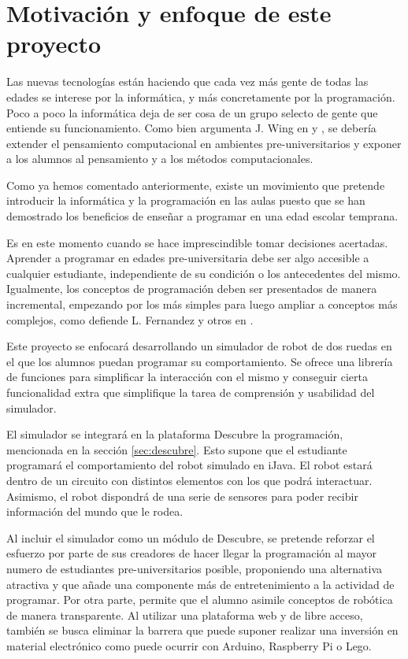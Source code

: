 \section{Motivación y enfoque de este proyecto}
\label{sec:motivacion}

Las nuevas tecnologías están haciendo que cada vez más gente de todas las edades se interese por la informática, y más concretamente por la programación. Poco a poco la informática deja de ser cosa de un grupo selecto de gente que entiende su funcionamiento. Como bien argumenta J. Wing en \cite{wing2006computational} y \cite{Wing3717}, se debería extender el pensamiento computacional en ambientes pre-universitarios y exponer a los alumnos al pensamiento y a los métodos computacionales.

Como ya hemos comentado anteriormente, existe un movimiento que pretende introducir la informática y la programación en las aulas puesto que se han demostrado los beneficios de enseñar a programar en una edad escolar temprana.

Es en este momento cuando se hace imprescindible tomar decisiones acertadas. Aprender a programar en edades pre-universitaria debe ser algo accesible a cualquier estudiante, independiente de su condición o los antecedentes del mismo. Igualmente, los conceptos de programación deben ser presentados de manera incremental, empezando por los más simples para luego ampliar a conceptos más complejos, como defiende L. Fernandez y otros en \cite{fernandez2002analisis}.

Este proyecto se enfocará desarrollando un simulador de robot de dos ruedas en el que los alumnos puedan programar su comportamiento. Se ofrece una librería de funciones para simplificar la interacción con el mismo y conseguir cierta funcionalidad extra que simplifique la tarea de comprensión y usabilidad del simulador.

El simulador se integrará en la plataforma Descubre la programación, mencionada en la sección \ref{sec:descubre}. Esto supone que el estudiante programará el comportamiento del robot simulado en iJava. El robot estará dentro de un circuito con distintos elementos con los que podrá interactuar. Asimismo, el robot dispondrá de una serie de sensores para poder recibir información del mundo que le rodea.

Al incluir el simulador como un módulo de Descubre, se pretende reforzar el esfuerzo por parte de sus creadores de hacer llegar la programación al mayor numero de estudiantes pre-universitarios posible, proponiendo una alternativa atractiva y que añade una componente más de entretenimiento a la actividad de programar. Por otra parte, permite que el alumno asimile conceptos de robótica de manera transparente. Al utilizar una plataforma web y de libre acceso, también se busca eliminar la barrera que puede suponer realizar una inversión en material electrónico como puede ocurrir con Arduino, Raspberry Pi o Lego.


